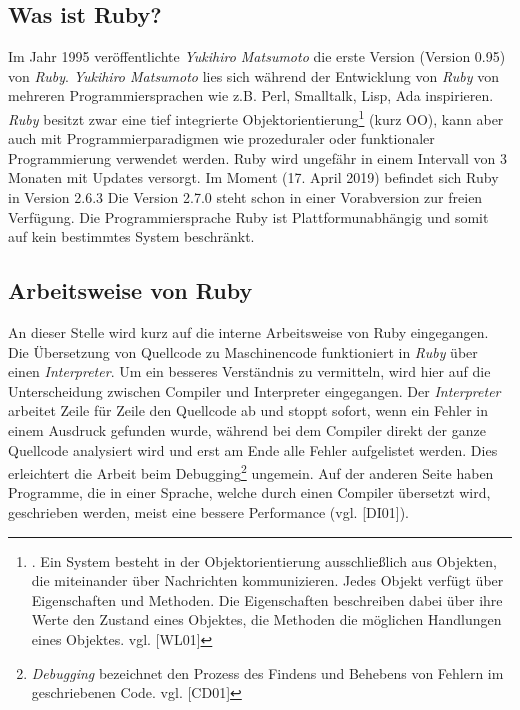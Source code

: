 \documentclass[12pt,DIV=14, version=first, BCOR=10mm,a4paper,twoside,parskip=half-,headsepline,headinclude]{scrartcl}
\begin{document}
\subsection{Was ist Ruby?} \label{Was ist Ruby?}
\begin{flushleft}
Im Jahr 1995 veröffentlichte \textit{Yukihiro Matsumoto} die erste Version (Version 0.95) von \textit{\glqq Ruby\grqq}. \textit{Yukihiro Matsumoto} lies sich während der Entwicklung von \textit{\glqq Ruby\grqq} von mehreren Programmiersprachen wie z.B. Perl, Smalltalk, Lisp, Ada inspirieren. \textit{Ruby} besitzt zwar eine tief integrierte
Objektorientierung\footnote{\label{foot:1}. Ein System besteht in der Objektorientierung ausschließlich aus Objekten, die miteinander über Nachrichten kommunizieren. Jedes Objekt verfügt über Eigenschaften und Methoden. Die Eigenschaften beschreiben dabei über ihre Werte den Zustand eines Objektes, die Methoden die möglichen Handlungen eines Objektes. vgl. [WL01]} (kurz OO), kann aber auch mit  Programmierparadigmen wie prozeduraler oder funktionaler Programmierung verwendet werden. Ruby wird ungefähr in einem Intervall von 3 Monaten mit Updates versorgt. Im Moment (17. April 2019) befindet sich Ruby in Version 2.6.3 Die Version 2.7.0 steht schon in einer Vorabversion zur freien Verfügung. Die Programmiersprache Ruby ist Plattformunabhängig und somit auf kein bestimmtes System beschränkt.
\end{flushleft}

\subsection{Arbeitsweise von Ruby}
\begin{flushleft}
An dieser Stelle wird kurz auf die interne Arbeitsweise von Ruby eingegangen. Die Übersetzung von Quellcode zu Maschinencode funktioniert in \textit{\glqq Ruby\grqq} über einen \textit{Interpreter}. Um ein besseres Verständnis zu vermitteln, wird hier auf die Unterscheidung zwischen Compiler und Interpreter eingegangen. Der \textit{Interpreter} arbeitet Zeile für Zeile den Quellcode ab und stoppt sofort, wenn ein Fehler in einem Ausdruck gefunden wurde, während bei dem Compiler direkt der ganze Quellcode analysiert wird und erst am Ende alle Fehler aufgelistet werden. Dies erleichtert die Arbeit beim Debugging\footnote{\label{foot:2} \textit{Debugging} bezeichnet den Prozess des Findens und Behebens von Fehlern im geschriebenen Code. vgl. [CD01]} ungemein. Auf der anderen Seite haben Programme, die in einer Sprache, welche durch einen Compiler übersetzt wird, geschrieben werden, meist eine bessere Performance (vgl. [DI01]).
\end{flushleft}
\end{document}
